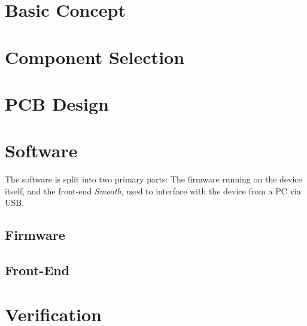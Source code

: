 \documentclass{fhnwreport/fhnwreport}
\begin{document}
\section{Basic Concept}
\label{sec:concept}



\clearpage
\section{Component Selection}
\label{sec:components}



\clearpage
\section{PCB Design}
\label{sec:pcb}



\clearpage
\section{Software}
\label{sec:software}
The software  is split  into two  primary parts: The  firmware running  on the
device itself,  and the  front-end \emph{Smooth}, used  to interface  with the
device from a PC via USB.
\subsection{Firmware}
\label{subsec:firmware}

\subsection{Front-End}
\label{subsec:frontend}



\clearpage
\section{Verification}
\label{sec:verification}

\end{document}
